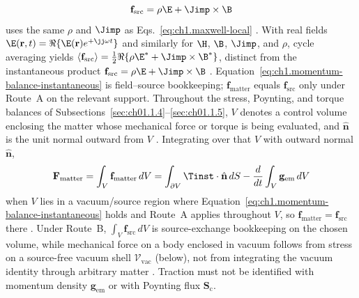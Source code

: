 \begin{equation}
\label{eq:ch1.maxwell-source-force}
\mathbf{f}_{\mathrm{src}}=\rho\E+\Jimp\times\B
\end{equation}
uses the same $\rho$ and $\Jimp$ as Eqs.~\eqref{eq:ch1.maxwell-local} \cite{maxwell1873,jackson1999}. With real fields $\E(\mathbf{r},t)=\Re\{\E(\mathbf{r})e^{+\jj\omega t}\}$ and similarly for $\H$, $\B$, $\Jimp$, and $\rho$, cycle averaging yields
$\langle\mathbf{f}_{\mathrm{src}}\rangle=\tfrac12\Re\{\rho\E^*+\Jimp\times\B^*\}$,
distinct from the instantaneous product $\mathbf{f}_{\mathrm{src}}=\rho\E+\Jimp\times\B$ \cite{stratton1941}. Equation~\eqref{eq:ch1.momentum-balance-instantaneous} is field--source bookkeeping; $\mathbf{f}_{\mathrm{matter}}$ equals $\mathbf{f}_{\mathrm{src}}$ only under Route~A on the relevant support.
Throughout the stress, Poynting, and torque balances of
Subsections~\ref{sec:ch01.1.4}--\ref{sec:ch01.1.5}, $V$ denotes a control volume
enclosing the matter whose mechanical force or torque is being evaluated, and
$\hat{\mathbf{n}}$ is the unit normal outward from $V$ \cite{stratton1941}.
Integrating over that $V$ with outward normal $\hat{\mathbf{n}}$,
\begin{equation}
\label{eq:ch1.momentum-integral-balance}
\mathbf{F}_{\mathrm{matter}}
=\int_V \mathbf{f}_{\mathrm{matter}}\,dV
=\int_{\partial V}\Tinst\cdot\hat{\mathbf{n}}\,dS
-\frac{d}{dt}\int_V \mathbf{g}_{\mathrm{em}}\,dV
\end{equation}
when $V$ lies in a vacuum/source region where Equation~\eqref{eq:ch1.momentum-balance-instantaneous} holds and Route~A applies throughout $V$, so $\mathbf{f}_{\mathrm{matter}}=\mathbf{f}_{\mathrm{src}}$ there \cite{stratton1941}. Under Route~B, $\int_V \mathbf{f}_{\mathrm{src}}\,dV$ is source-exchange bookkeeping on the chosen volume, while mechanical force on a body enclosed in vacuum follows from stress on a source-free vacuum shell $\mathcal{V}_{\mathrm{vac}}$ (below), not from integrating the vacuum identity through arbitrary matter \cite{stratton1941,harrington2001}. Traction must not be identified with momentum density $\mathbf{g}_{\mathrm{em}}$ or with Poynting flux $\mathbf{S}_\mathrm{c}$.

